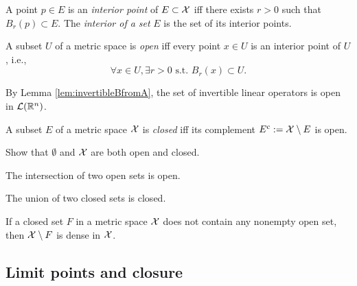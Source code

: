 \begin{defn}
  \label{def:interiorPoint}
  A point $p\in E$ is an \emph{interior point} of $E\subset {\cal X}$
  iff there exists $r>0$ such that $B_r(p)\subset E$.
  The \emph{interior of a set} $E$
  is the set of its interior points.
\end{defn}

\begin{defn}
  \label{def:openSetInMetricSpace}
  A subset $U$ of a metric space is \emph{open} iff
  every point $x\in U$ is an interior point of $U$, i.e., 
  \begin{displaymath}
    \forall x\in U, \exists r>0 \text{ s.t. }
    B_r(x)\subset U.
  \end{displaymath}
\end{defn}

\begin{exm}
  \label{exm:invertibleOpSetIsOpen}
  By Lemma \ref{lem:invertibleBfromA},
  the set of invertible linear operators is open
  in ${\cal L}(\mathbb{R}^n)$.
\end{exm}

\begin{defn}
  \label{def:closedSets}
  A subset $E$ of a metric space ${\cal X}$ is \emph{closed}
  iff its complement $E^c:={\cal X}\setminus E$ is open.
\end{defn}

\begin{exc}
  Show that $\emptyset$ and ${\cal X}$
  are both open and closed.
\end{exc}

\begin{lem}
  \label{lem:intersectionOpenSets}
  The intersection of two open sets is open.
\end{lem}

\begin{lem}
  \label{lem:unionClosedSets}
  The union of two closed sets is closed.
\end{lem}

\begin{exc}
  \label{exc:meagerSetComplementIsDense}
  If a closed set $F$ in a metric space ${\cal X}$
  does not contain any nonempty open set,
  then ${\cal X}\setminus F$ is dense in ${\cal X}$.
\end{exc}

\subsection{Limit points and closure}
\label{sec:limit-points-conv}

